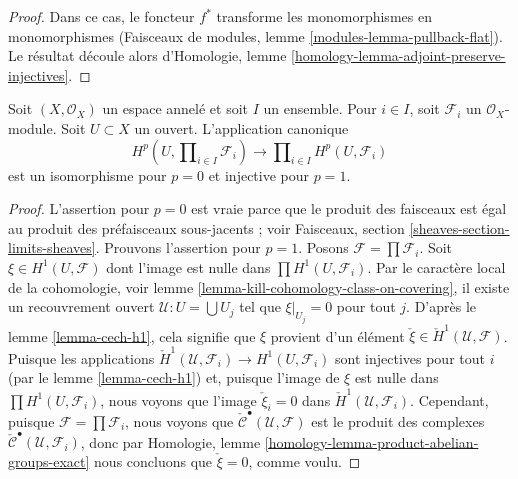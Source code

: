 \begin{proof}

Dans ce cas, le foncteur $f^*$ transforme les monomorphismes en monomorphismes (Faisceaux de modules, lemme \ref{modules-lemma-pullback-flat}). Le résultat découle alors d'Homologie, lemme \ref{homology-lemma-adjoint-preserve-injectives}.

\end{proof}

\begin{lemma}

\label{lemma-cohomology-products}
Soit $(X, \mathcal{O}_X)$ un espace annelé et soit $I$ un ensemble. Pour $i \in I$, soit $\mathcal{F}_i$ un $\mathcal{O}_X$-module. Soit $U \subset X$ un ouvert. L'application canonique $$
H^p(U, \prod\nolimits_{i \in I} \mathcal{F}_i)
\longrightarrow
\prod\nolimits_{i \in I} H^p(U, \mathcal{F}_i)
$$ est un isomorphisme pour $p = 0$ et injective pour $p = 1$.
\end{lemma}

\begin{proof}

L'assertion pour $p = 0$ est vraie parce que le produit des faisceaux est égal au produit des préfaisceaux sous-jacents ; voir Faisceaux, section \ref{sheaves-section-limits-sheaves}. Prouvons l'assertion pour $p = 1$. Posons $\mathcal{F} = \prod \mathcal{F}_i$. Soit $\xi \in H^1(U, \mathcal{F})$ dont l'image est nulle dans
$\prod H^1(U, \mathcal{F}_i)$. Par le caractère local de la cohomologie, voir lemme \ref{lemma-kill-cohomology-class-on-covering}, il existe un recouvrement ouvert $\mathcal{U} : U = \bigcup U_j$ tel que
$\xi|_{U_j} = 0$ pour tout $j$. D'après le lemme \ref{lemma-cech-h1}, cela signifie que
$\xi$ provient d'un élément
$\check \xi \in \check H^1(\mathcal{U}, \mathcal{F})$. Puisque les applications
$\check H^1(\mathcal{U}, \mathcal{F}_i) \to H^1(U, \mathcal{F}_i)$
sont injectives pour tout $i$ (par le lemme \ref{lemma-cech-h1}) et, puisque l'image de $\xi$ est nulle dans $\prod H^1(U, \mathcal{F}_i)$, nous voyons que l'image
$\check \xi_i = 0$ dans $\check H^1(\mathcal{U}, \mathcal{F}_i)$. Cependant, puisque $\mathcal{F} = \prod \mathcal{F}_i$, nous voyons que
$\check{\mathcal{C}}^\bullet(\mathcal{U}, \mathcal{F})$ est le produit des complexes
$\check{\mathcal{C}}^\bullet(\mathcal{U}, \mathcal{F}_i)$, donc par Homologie, lemme \ref{homology-lemma-product-abelian-groups-exact}
nous concluons que $\check \xi = 0$, comme voulu.

\end{proof}







